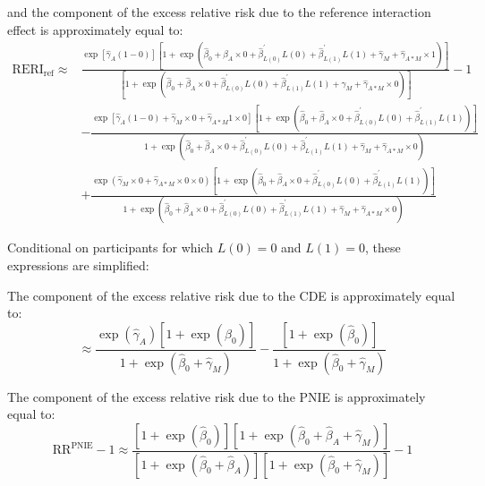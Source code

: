 \documentclass[
]{book}
\begin{document}
and the component of the excess relative risk due to the reference interaction effect is approximately equal to:
\[
\begin{array}{rl}
\text{RERI}_\text{ref} \approx  & \frac{\exp \left[ \hat{\gamma}_A (1 - 0)\right] \left[1 + \exp \left(\hat{\beta}_0 + \hat{\beta}_A \times 0 + \hat{\beta}_{L(0)}^\prime L(0) + \hat{\beta}_{L(1)}^\prime L(1) + \hat{\gamma}_M + \hat{\gamma}_{A \ast M} \times 1\right) \right]}{\left[ 1 + \exp \left(\hat{\beta}_0 + \hat{\beta}_A \times 0 + \hat{\beta}_{L(0)}^\prime L(0) + \hat{\beta}_{L(1)}^\prime L(1) + \hat{\gamma}_M + \hat{\gamma}_{A \ast M} \times 0\right)\right] } - 1 \\
                                & - \frac{\exp \left[ \hat{\gamma}_A (1 - 0) + \hat{\gamma}_M \times 0 + \hat{\gamma}_{A \ast M} 1 \times 0 \right] \left[1 + \exp \left(\hat{\beta}_0 + \hat{\beta}_A \times 0 + \hat{\beta}_{L(0)}^\prime L(0) + \hat{\beta}_{L(1)}^\prime L(1) \right) \right]}{ 1 + \exp \left(\hat{\beta}_0 + \hat{\beta}_A \times 0 + \hat{\beta}_{L(0)}^\prime L(0) + \hat{\beta}_{L(1)}^\prime L(1) + \hat{\gamma}_M + \hat{\gamma}_{A \ast M} \times 0 \right)} \\
                                & + \frac{\exp \left( \hat{\gamma}_M \times 0 + \hat{\gamma}_{A \ast M} \times 0 \times 0 \right) \left[1 + \exp \left(\hat{\beta}_0 + \hat{\beta}_A \times 0 + \hat{\beta}_{L(0)}^\prime L(0) + \hat{\beta}_{L(1)}^\prime L(1) \right) \right]}{ 1 + \exp \left(\hat{\beta}_0 + \hat{\beta}_A \times 0 + \hat{\beta}_{L(0)}^\prime L(0) + \hat{\beta}_{L(1)}^\prime L(1) + \hat{\gamma}_M + \hat{\gamma}_{A \ast M} \times 0 \right) } 
\end{array}\]

Conditional on participants for which \(L(0)=0\) and \(L(1)=0\), these expressions are simplified:

The component of the excess relative risk due to the CDE is approximately equal to:
\[ \approx \frac{\exp \left( \hat{\gamma}_A \right) \left[ 1 + \exp \left( \hat{\beta}_0 \right) \right]}{1 + \exp \left( \hat{\beta}_0 + \hat{\gamma}_M \right)} - \frac{ \left[ 1 + \exp \left( \hat{\beta}_0 \right) \right]}{1 + \exp \left( \hat{\beta}_0 + \hat{\gamma}_M \right)}\]

The component of the excess relative risk due to the PNIE is approximately equal to:
\[\text{RR}^\text{PNIE} - 1 \approx \frac{\left[ 1 + \exp \left( \hat{\beta}_0 \right) \right] \left[ 1 + \exp \left( \hat{\beta}_0 + \hat{\beta}_A + \hat{\gamma}_M \right) \right]}{\left[ 1 + \exp \left( \hat{\beta}_0 + \hat{\beta}_A \right) \right] \left[ 1 + \exp \left( \hat{\beta}_0 + \hat{\gamma}_M \right) \right] } - 1 \]
\end{document}
